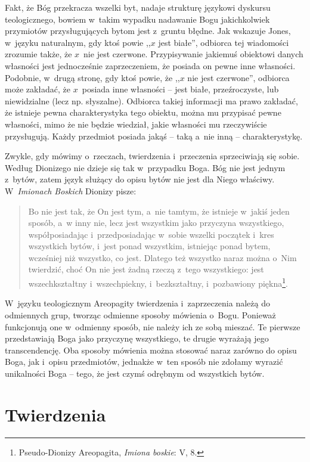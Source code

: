 Fakt, że Bóg przekracza wszelki byt, nadaje strukturę językowi dyskursu teologicznego, bowiem w~takim wypadku nadawanie Bogu jakichkolwiek przymiotów przysługujących bytom jest z~gruntu błędne. Jak wskazuje Jones, w~języku naturalnym, gdy ktoś powie ,,$x$ jest białe'', odbiorca tej wiadomości zrozumie także, że $x$~nie jest czerwone. Przypisywanie jakiemuś obiektowi danych własności jest jednocześnie zaprzeczeniem, że posiada on pewne inne własności. Podobnie, w~drugą stronę, gdy ktoś powie, że ,,$x$ nie jest czerwone'', odbiorca może zakładać, że $x$~posiada inne własności -- jest białe, przeźroczyste, lub niewidzialne (lecz np. słyszalne). Odbiorca takiej informacji ma prawo zakładać, że istnieje pewna charakterystyka tego obiektu, można mu przypisać pewne własności, mimo że nie będzie wiedział, jakie własności mu rzeczywiście przysługują. Każdy przedmiot posiada jakąś -- taką a~nie inną -- charakterystykę.

Zwykle, gdy mówimy o~rzeczach, twierdzenia i~przeczenia sprzeciwiają się sobie. Według Dionizego nie dzieje się tak w~przypadku Boga. Bóg nie jest jednym z~bytów, zatem język służący do opisu bytów nie jest dla Niego właściwy. W~\textit{Imionach Boskich} Dionizy pisze:

\begin{quote}
Bo nie jest tak, że On jest tym, a~nie tamtym, że istnieje w~jakiś jeden sposób, a~w inny nie, lecz jest wszystkim jako przyczyna wszystkiego, współposiadając i~przedposiadając w~sobie wszelki początek i~kres wszystkich bytów, i~jest ponad wszystkim, istniejąc ponad bytem, wcześniej niż wszystko, co jest. Dlatego też wszystko naraz można o~Nim twierdzić, choć On nie jest żadną rzeczą z~tego wszystkiego: jest wszechkształtny i~wszechpiekny, i~bezkształtny, i~pozbawiony piękna\footnote{Pseudo-Dionizy Areopagita, \textit{Imiona boskie}: V, 8.}.
\end{quote}

W~języku teologicznym Areopagity twierdzenia i~zaprzeczenia należą do odmiennych grup, tworząc odmienne sposoby mówienia o~Bogu. Ponieważ funkcjonują one w~odmienny sposób, nie należy ich ze sobą mieszać. Te pierwsze przedstawiają Boga jako przyczynę wszystkiego, te drugie wyrażają jego transcendencję. Oba sposoby mówienia można stosować naraz zarówno do opisu Boga, jak i~opisu przedmiotów, jednakże w~ten sposób nie zdołamy wyrazić unikalności Boga -- tego, że jest czymś odrębnym od wszystkich bytów.


\section{Twierdzenia}

